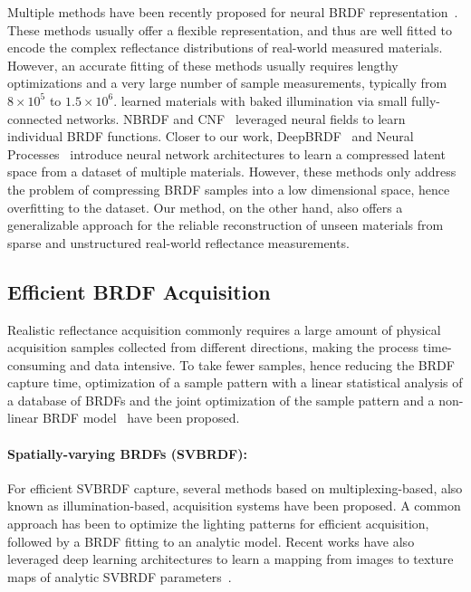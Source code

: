 Multiple methods have been recently proposed for neural BRDF representation~\cite{rainer2019neural, hu2020deepbrdf, sztrajman2021neural, zheng2021compact, maximov2019deep, chen2021invertible, fan2021neural, cnf2023}. These methods usually offer a flexible representation, and thus are well fitted to encode the complex reflectance distributions of real-world measured materials. However, an accurate fitting of these methods usually requires lengthy optimizations and a very large number of sample measurements, typically from $8 \times 10^5$ to $1.5 \times 10^6$. \cite{maximov2019deep} learned materials with baked illumination via small fully-connected networks. NBRDF \cite{sztrajman2021neural} and CNF~\cite{cnf2023} leveraged neural fields to learn individual BRDF functions. Closer to our work, DeepBRDF~\cite{hu2020deepbrdf} and Neural Processes~\cite{zheng2021compact} introduce neural network architectures to learn a compressed latent space from a dataset of multiple materials. However, these methods only address the problem of compressing BRDF samples into a low dimensional space, hence overfitting to the dataset. Our method, on the other hand, also offers a generalizable approach for the reliable reconstruction of unseen materials from sparse and unstructured real-world reflectance measurements.


\subsection{Efficient BRDF Acquisition}
Realistic reflectance acquisition commonly requires a large amount of physical acquisition samples collected from different directions, making the process time-consuming and data intensive. To take fewer samples, hence reducing the BRDF capture time, optimization of a sample pattern with a linear statistical analysis of a database of BRDFs \cite{nielsen2015optimal} and the joint optimization of the sample pattern and a non-linear BRDF model~\cite{liu2023learning} have been proposed.

\paragraph{Spatially-varying BRDFs (SVBRDF):} For efficient SVBRDF capture, several methods based on multiplexing-based, also known as illumination-based, acquisition systems \cite{kang2018efficient, kang2019learning, ma2021free, ma2023opensvbrdf, tunwattanapong2013acquiring} have been proposed. A common approach has been to optimize the lighting patterns for efficient acquisition, followed by a BRDF fitting to an analytic model. Recent works have also leveraged deep learning architectures to learn a mapping from images to texture maps of analytic SVBRDF parameters~\cite{guo2021highlight, hui2017reflectance, deschaintre2018single, deschaintre2019flexible, martin2022materia, zhou2021adversarial,gao2019deep}. 

